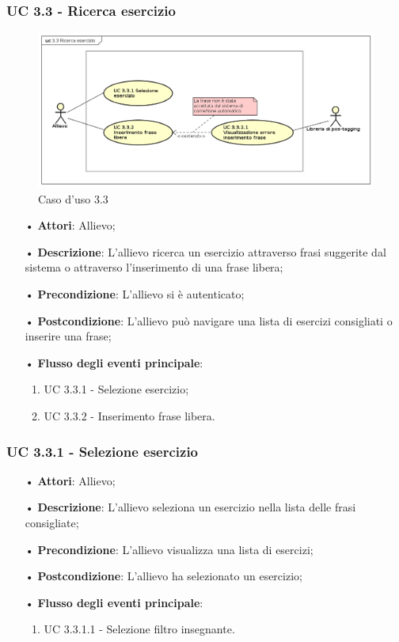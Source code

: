\subsubsection{UC 3.3 - Ricerca esercizio}
\begin{figure}[H]
\centering
\includegraphics[width=17cm]{img/UC33.png} 
\caption{Caso d'uso 3.3}\label{fig:33}
\end{figure}
\begin{itemize}
\item[•]\textbf{Attori}: Allievo;
\item[•]\textbf{Descrizione}: L'allievo ricerca un esercizio attraverso frasi suggerite dal sistema o attraverso l'inserimento di una frase libera;
\item[•]\textbf{Precondizione}: L'allievo si è autenticato;
\item[•]\textbf{Postcondizione}: L'allievo può navigare una lista di esercizi consigliati o inserire una frase;
\item[•]\textbf{Flusso degli eventi principale}:
\begin{enumerate}
\item UC 3.3.1 - Selezione esercizio;
\item UC 3.3.2 - Inserimento frase libera.
\end{enumerate}
\end{itemize}

\subsubsection{UC 3.3.1 - Selezione esercizio}
\begin{itemize}
\item[•]\textbf{Attori}: Allievo;
\item[•]\textbf{Descrizione}: L'allievo seleziona un esercizio nella lista delle frasi consigliate;
\item[•]\textbf{Precondizione}: L'allievo visualizza una lista di esercizi;
\item[•]\textbf{Postcondizione}: L'allievo ha selezionato un esercizio;
\item[•]\textbf{Flusso degli eventi principale}:
\begin{enumerate}
\item UC 3.3.1.1 - Selezione filtro insegnante.
\end{enumerate}
\end{itemize}

